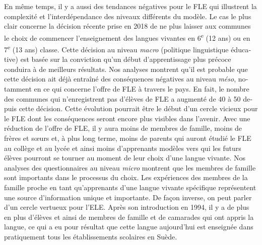 \documentclass[french, output=paper]{langscibook}
\begin{document}
\begin{otherlanguage}{french}
En même temps, il y a aussi des tendances négatives pour le FLE qui illustrent la complexité et l’interdépendance des niveaux différents du modèle. Le cas le plus clair concerne la décision récente prise en 2018 de ne plus laisser aux communes le choix de commencer l’enseignement des langues vivantes en 6\textsuperscript{e} (12 ans) ou en 7\textsuperscript{e} (13 ans) classe. Cette décision au niveau \textit{macro} (politique linguistique éducative) est basée sur la conviction qu’un début d’apprentissage plus précoce conduira à de meilleurs résultats. Nos analyses montrent qu’il est probable que cette décision ait déjà entraîné des conséquences négatives au niveau \textit{méso}, notamment en ce qui concerne l’offre de FLE à travers le pays. En fait, le nombre des communes qui n’enregistrent pas d’élèves de FLE a augmenté de 40 à 50 depuis cette décision. Cette évolution pourrait être le début d’un cercle vicieux pour le FLE dont les conséquences seront encore plus visibles dans l’avenir. Avec une réduction de l’offre de FLE, il y aura moins de membres de famille, moins de frères et sœurs et, à plus long terme, moins de parents qui auront étudié le FLE au collège et au lycée et ainsi moins d’apprenants modèles vers qui les futurs élèves pourront se tourner au moment de leur choix d’une langue vivante. Nos analyses des questionnaires au niveau \textit{micro} montrent que les membres de famille sont importants dans le processus du choix. Les expériences des membres de la famille proche en tant qu’apprenants d’une langue vivante spécifique représentent une source d’information unique et importante. De façon inverse, on peut parler d’un cercle vertueux pour l’ELE. Après son introduction en 1994, il y a de plus en plus d’élèves et ainsi de membres de famille et de camarades qui ont appris la langue, ce qui a eu pour résultat que cette langue aujourd’hui est enseignée dans pratiquement tous les établissements scolaires en Suède. 


\end{otherlanguage}
\end{document}
